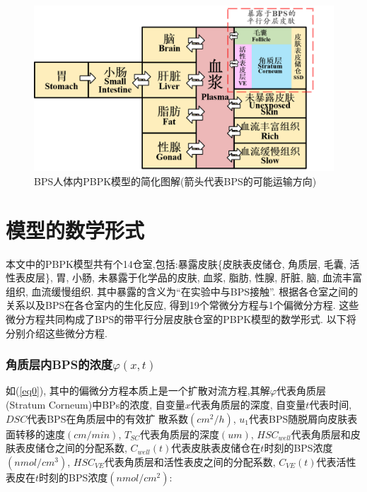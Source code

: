\documentclass[a4paper,punct=banjiao,twoside]{ctexrep}
\theoremstyle{plain}
\theoremstyle{definition}
\theoremstyle{remark}
\begin{document}
\begin{figure}[H]
  \centering
  \includegraphics[scale=0.6]{./figs/p2.png}
  \caption{BPS人体内PBPK模型的简化图解(箭头代表BPS的可能运输方向)}
  \label{模型图解}
\end{figure}
\section{模型的数学形式}
本文中的PBPK模型共有个14仓室,包括:暴露皮肤\{皮肤表皮储仓, 角质层, 毛囊, 活性表皮层\}, 胃, 小肠, 未暴露于化学品的皮肤, 血浆, 脂肪, 性腺, 肝脏, 脑, 血流丰富组织, 血流缓慢组织.
其中暴露的含义为“在实验中与BPS接触”.
根据各仓室之间的关系以及BPS在各仓室内的生化反应, 得到19个常微分方程与1个偏微分方程. 这些微分方程共同构成了BPS的带平行分层皮肤仓室的PBPK模型的数学形式. 
以下将分别介绍这些微分方程. 

\subsubsection*{角质层内BPS的浓度$\varphi(x,t)$}
如(\ref{eq0}), 其中的偏微分方程本质上是一个扩散对流方程,其解$\varphi$代表角质层(Stratum Corneum)中BPs的浓度, 自变量$x$代表角质层的深度, 自变量$t$代表时间, $DSC$代表BPS在角质层中的有效扩
散系数$(cm^2/h)$, $u_1$代表BPS随脱屑向皮肤表面转移的速度$(cm/min)$, $T_{SC}$代表角质层的深度$(um)$, $HSC_{well}$代表角质层和皮肤表皮储仓之间的分配系数, 
$C_{well}(t)$代表皮肤表皮储仓在$t$时刻的BPS浓度$(nmol/cm^3)$, $HSC_{VE}$代表角质层和活性表皮之间的分配系数, $C_{VE}(t)$代表活性表皮在$t$时刻的BPS浓度$(nmol/cm^2)$:
\end{document}

